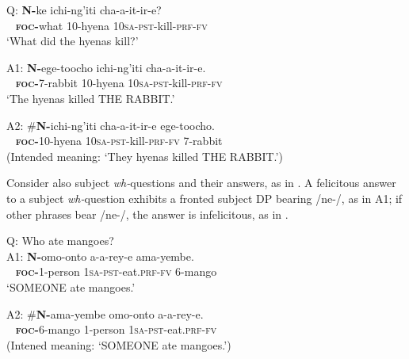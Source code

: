 \documentclass[output=paper,modfonts]{langscibook}
\begin{document}
\ea\label{ex:landmann:6}
\gll Q: \textbf{N-}ke ichi-ng’iti cha-a-it-ir-e?\\
    ~ \textsc{\textbf{foc}}\textbf{-}what 10-hyena \textsc{10sa}-\textsc{pst}-kill-\textsc{prf}-\textsc{fv}\\
\glt ‘What did the hyenas kill?’
\z

\ea\label{ex:landmann:7}
\gll A1: \textbf{N-}ege-toocho ichi-ng’iti cha-a-it-ir-e.\\
     ~ \textsc{\textbf{foc}}\textbf{-}7-rabbit 10-hyena \textsc{10sa}-\textsc{pst}-kill-\textsc{prf}-\textsc{fv}\\
\glt ‘The hyenas killed THE RABBIT.’
\z

\ea\label{ex:landmann:8}
\gll A2: \#\textbf{N-}ichi-ng’iti cha-a-it-ir-e ege-toocho.\\
     ~ \textsc{\textbf{foc}}\textbf{-}10-hyena \textsc{10sa}-\textsc{pst}-kill-\textsc{prf}-\textsc{fv} 7-rabbit\\
\glt (Intended meaning: ‘They hyenas killed THE RABBIT.’)
\z

 
Consider also subject \textit{wh-}questions and their answers, as in . A felicitous answer to a subject \textit{wh-}question exhibits a fronted subject DP bearing /ne-/, as in A1; if other phrases bear /ne-/, the answer is infelicitous, as in .

\ea\label{ex:landmann:9}
    Q: Who ate mangoes?\\
\gll A1: \textbf{N-}omo-onto a-a-rey-e ama-yembe.\\
    ~ \textsc{\textbf{foc}}\textbf{-}1-person \textsc{1sa}-\textsc{pst}-eat.\textsc{prf}-\textsc{fv} 6-mango\\
\glt ‘SOMEONE ate mangoes.’
\z

\ea\label{ex:landmann:10}
\gll A2: \#\textbf{N-}ama-yembe omo-onto a-a-rey-e.\\
    ~ \textsc{\textbf{foc}}\textbf{-}6-mango 1-person \textsc{1sa}-\textsc{pst}-eat.\textsc{prf}-\textsc{fv}\\
\glt (Intened meaning: ‘SOMEONE ate mangoes.’)
\z
\end{document}
